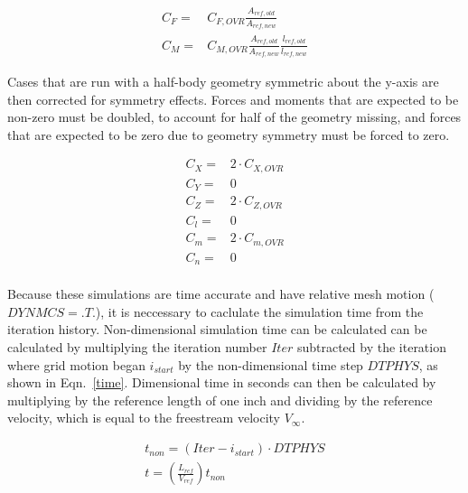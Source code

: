 \documentclass[]{aiaa-tc}%
\begin{document}
\begin{equation}
\begin{split}
C_{F} =& C_{F,OVR} \frac{A_{ref,old}}{A_{ref,new}} \\
C_{M} =& C_{M,OVR} \frac{A_{ref,old}}{A_{ref,new}} \frac{l_{ref,old}}{l_{ref,new}}
\end{split}
\label{refparams}
\end{equation}

Cases that are run with a half-body geometry symmetric about the y-axis are then corrected for symmetry effects.  Forces and moments that are expected to be non-zero must be doubled, to account for half of the geometry missing, and forces that are expected to be zero due to geometry symmetry must be forced to zero.

\begin{equation}
\begin{split}
C_{X} =& 2 \cdot C_{X,OVR} \\
C_{Y} =& 0           \\
C_{Z} =& 2 \cdot C_{Z,OVR} \\
C_{l} =& 0           \\
C_{m} =& 2 \cdot C_{m,OVR} \\
C_{n} =& 0           \\
\end{split}
\label{refparams}
\end{equation}

Because these simulations are time accurate and have relative mesh motion ($DYNMCS=.T.$), it is neccessary to caclulate the simulation time from the iteration history.  Non-dimensional simulation time can be calculated can be calculated by multiplying the iteration number $Iter$ subtracted by the iteration where grid motion began $i_{start}$ by the non-dimensional time step $DTPHYS$, as shown in Eqn.~\ref{time}.  Dimensional time in seconds can then be calculated by multiplying by the reference length of one inch and dividing by the reference velocity, which is equal to the freestream velocity $V_{\infty}$.

\begin{equation}
\begin{gathered}
t_{non} = (Iter - i_{start}) \cdot DTPHYS \\
t = \left(\frac{L_{ref}}{V_{ref}}\right) t_{non}
\end{gathered}
\label{time}
\end{equation}


% 
\end{document}
